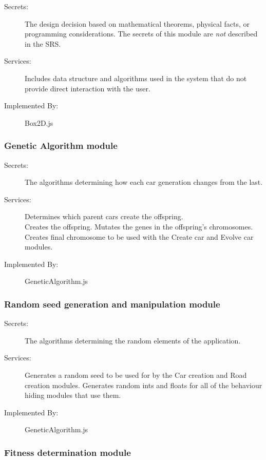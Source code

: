 \documentclass[12pt, titlepage]{article}
\begin{document}
\begin{description}
\item[Secrets:] The design decision based on mathematical theorems, physical
  facts, or programming considerations. The secrets of this module are
  \emph{not} described in the SRS.
\item[Services:] Includes data structure and algorithms used in the system that
  do not provide direct interaction with the user. 
\item[Implemented By:] \color{RoyalPurple}Box2D.js
\end{description}

\subsubsection{Genetic Algorithm module}

\begin{description}
\item[Secrets:] The algorithms determining how each car generation changes from 
the last.
\item[Services:] Determines which parent cars create the offspring. \\ Creates 
the 
offspring. Mutates the genes in the offspring's chromosomes. Creates final 
chromosome to be used with the Create car and Evolve car modules.
\item[Implemented By:] \color{RoyalPurple}GeneticAlgorithm.js
\end{description}

\subsubsection{Random seed generation and manipulation module}

\begin{description}
\item[Secrets:] The algorithms determining the random elements of the 
application.
\item[Services:] Generates a random seed to be used for by the Car creation and 
Road creation modules. Generates random ints and floats for all of the behaviour 
hiding modules that use them.
\item[Implemented By:] \color{RoyalPurple} GeneticAlgorithm.js
\end{description}

\subsubsection{Fitness determination module}
\end{document}
